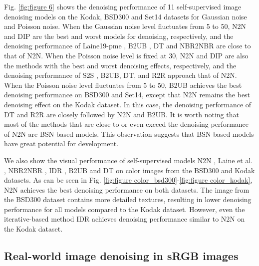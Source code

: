 \documentclass[conference]{IEEEtran}
\begin{document}
Fig. \ref{fig:figure 6} shows the denoising performance of 11 self-supervised image denoising models on the Kodak\cite{franzen1999kodak}, BSD300\cite{roth2005fields} and Set14\cite{zeyde2012single} datasets for Gaussian noise and Poisson noise. When the Gaussian noise level fluctuates from 5 to 50, N2N \cite{lehtinen2018noise2noise} and DIP \cite{ulyanov2018deep} are the best and worst models for denoising, respectively, and the denoising performance of Laine19-pme \cite{laine2019high}, B2UB \cite{wang2022blind2unblind}, DT \cite{zhang2023self} and NBR2NBR \cite{huang2021neighbor2neighbor} are close to that of N2N. When the Poisson noise level is fixed at 30, N2N and DIP are also the methods with the best and worst denoising effects, respectively, and the denoising performance of S2S \cite{quan2020self2self}, B2UB, DT, and R2R \cite{pang2021recorrupted} approach that of N2N. When the Poisson noise level fluctuates from 5 to 50, B2UB achieves the best denoising performance on BSD300 and Set14, except that N2N remains the best denoising effect on the Kodak dataset. In this case, the denoising performance of DT and R2R are closely followed by N2N and B2UB. It is worth noting that most of the methods that are close to or even exceed the denoising performance of N2N are BSN-based models. This observation suggests that BSN-based models have great potential for development.

We also show the visual performance of self-supervised models N2N \cite{lehtinen2018noise2noise}, Laine et al. \cite{laine2019high}, NBR2NBR \cite{huang2021neighbor2neighbor}, IDR \cite{zhang2022idr}, B2UB \cite{wang2022blind2unblind} and DT \cite{zhang2023self} on color images from the BSD300 \cite{roth2005fields} and Kodak \cite{franzen1999kodak} datasets. As can be seen in Fig. \ref{fig:figure color_bsd300}-\ref{fig:figure color_kodak}, N2N achieves the best denoising performance on both datasets. The image from the BSD300 dataset contains more detailed textures, resulting in lower denoising performance for all models compared to the Kodak dataset. However, even the iterative-based method IDR achieves denoising performance similar to N2N on the Kodak dataset.

\subsection{Real-world image denoising in sRGB images}
\end{document}
